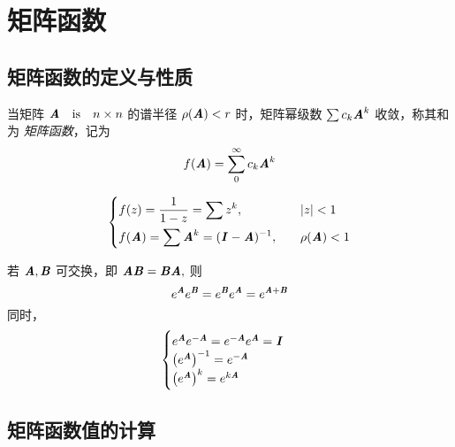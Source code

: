 \section{矩阵函数}
\label{sec:矩阵函数}

\subsection{矩阵函数的定义与性质}
\label{sub:矩阵函数的定义与性质}
\begin{definition} 当矩阵 $\ann$ 的谱半径 $\rho(\MA) < r$ 时，矩阵幂级数 $\sum c_k \MA^k$ 收敛，称其和为 \emph{矩阵函数}，记为 \[ f(\MA) = \sum_0^{\infty} c_k \MA^k \] \end{definition} \begin{example} \[ \begin{dcases} f(z) = \frac{1}{1 - z} = \sum z^k, \quad & \abs{z} < 1 \\ f(\MA) = \sum \MA^k = (\MI - \MA)^{-1}, \quad & \rho(\MA) < 1 \end{dcases} \] \end{example} \begin{theorem} 若 $\MA, \MB$ 可交换，即 $\MA \MB = \MB \MA,$ 则 \[ e^{\MA} e^{\MB} = e^{\MB} e^{\MA} = e^{\MA + \MB} \] 同时， \[ \begin{cases} e^{\MA} e^{-\MA} = e^{-\MA} e^{\MA} = \MI \\ \left( e^{\MA} \right)^{-1} = e^{-\MA} \\ \left( e^{\MA} \right)^{k} = e^{k\MA} \end{cases} \] \end{theorem} 
\subsection{矩阵函数值的计算}
\label{sub:矩阵函数值的计算}
